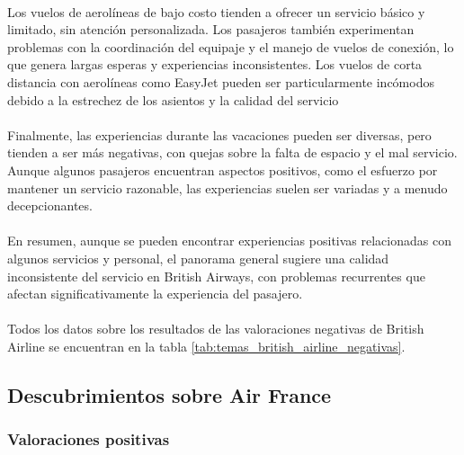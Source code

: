\documentclass{report}
\begin{document}
                    \paragraph*{}{
                        Los vuelos de aerolíneas de bajo costo tienden a ofrecer un servicio básico y limitado, sin atención personalizada. Los pasajeros también experimentan problemas con la coordinación del equipaje y el manejo de vuelos de conexión, lo que genera largas esperas y experiencias inconsistentes. Los vuelos de corta distancia con aerolíneas como EasyJet pueden ser particularmente incómodos debido a la estrechez de los asientos y la calidad del servicio
                    }
                    \paragraph*{}{
                        Finalmente, las experiencias durante las vacaciones pueden ser diversas, pero tienden a ser más negativas, con quejas sobre la falta de espacio y el mal servicio. Aunque algunos pasajeros encuentran aspectos positivos, como el esfuerzo por mantener un servicio razonable, las experiencias suelen ser variadas y a menudo decepcionantes.
                    }
                    \paragraph*{}{
                        En resumen, aunque se pueden encontrar experiencias positivas relacionadas con algunos servicios y personal, el panorama general sugiere una calidad inconsistente del servicio en British Airways, con problemas recurrentes que afectan significativamente la experiencia del pasajero.
                    }
                    \paragraph*{}{
                        Todos los datos sobre los resultados de las valoraciones negativas de British Airline se encuentran en la tabla \ref{tab:temas_british_airline_negativas}.
                    }
            \clearpage\subsection{Descubrimientos sobre Air France}
                \subsubsection*{Valoraciones positivas}
\end{document}
